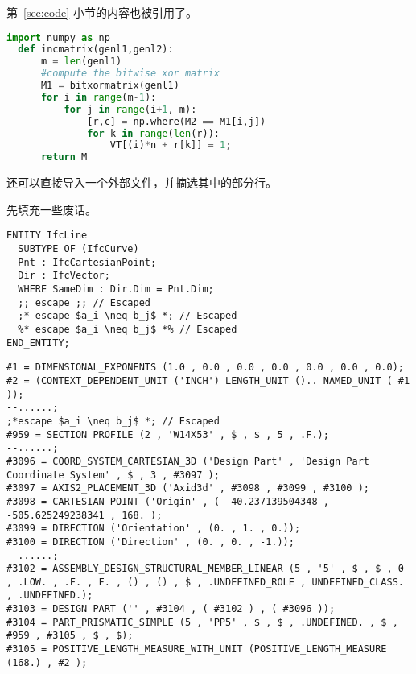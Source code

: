 \documentclass[../Main/thesis]{subfiles}
\begin{document}
第~\ref{sec:code} 小节的内容也被引用了。

\begin{lstlisting}[language=Python,
  caption=中文标题没有括号,
  label=lst:outer,
  style=colorEX]
  import numpy as np
  def incmatrix(genl1,genl2):
      m = len(genl1)
      #compute the bitwise xor matrix
      M1 = bitxormatrix(genl1)
      for i in range(m-1):
          for j in range(i+1, m):
              [r,c] = np.where(M2 == M1[i,j])
              for k in range(len(r)):
                  VT[(i)*n + r[k]] = 1;
      return M
\end{lstlisting}

还可以直接导入一个外部文件，并摘选其中的部分行。



先填充一些废话。\zhlipsum[12]

\begin{lstlisting}[language=EXPRESS,
  caption=IfcLine的EXPRESS定义,
  label=lst:ifcline-express,
  style=colorEX]
ENTITY IfcLine
  SUBTYPE OF (IfcCurve)
  Pnt : IfcCartesianPoint;
  Dir : IfcVector;
  WHERE SameDim : Dir.Dim = Pnt.Dim;
  ;; escape ;; // Escaped
  ;* escape $a_i \neq b_j$ *; // Escaped
  %* escape $a_i \neq b_j$ *% // Escaped
END_ENTITY;
\end{lstlisting}

\begin{lstlisting}[language=EXPRESS,
  caption=CIS/2中的梁,
  label=lst:cis2beam,
  style=colorEX]
#1 = DIMENSIONAL_EXPONENTS (1.0 , 0.0 , 0.0 , 0.0 , 0.0 , 0.0 , 0.0);
#2 = (CONTEXT_DEPENDENT_UNIT ('INCH') LENGTH_UNIT ().. NAMED_UNIT ( #1 ));
--......;
;*escape $a_i \neq b_j$ *; // Escaped
#959 = SECTION_PROFILE (2 , 'W14X53' , $ , $ , 5 , .F.);
--......;
#3096 = COORD_SYSTEM_CARTESIAN_3D ('Design Part' , 'Design Part Coordinate System' , $ , 3 , #3097 );
#3097 = AXIS2_PLACEMENT_3D ('Axid3d' , #3098 , #3099 , #3100 );
#3098 = CARTESIAN_POINT ('Origin' , ( -40.237139504348 , -505.625249238341 , 168. );
#3099 = DIRECTION ('Orientation' , (0. , 1. , 0.));
#3100 = DIRECTION ('Direction' , (0. , 0. , -1.));
--......;
#3102 = ASSEMBLY_DESIGN_STRUCTURAL_MEMBER_LINEAR (5 , '5' , $ , $ , 0 , .LOW. , .F. , F. , () , () , $ , .UNDEFINED_ROLE , UNDEFINED_CLASS. , .UNDEFINED.);
#3103 = DESIGN_PART ('' , #3104 , ( #3102 ) , ( #3096 ));
#3104 = PART_PRISMATIC_SIMPLE (5 , 'PP5' , $ , $ , .UNDEFINED. , $ , #959 , #3105 , $ , $);
#3105 = POSITIVE_LENGTH_MEASURE_WITH_UNIT (POSITIVE_LENGTH_MEASURE (168.) , #2 );
\end{lstlisting}
\end{document}
